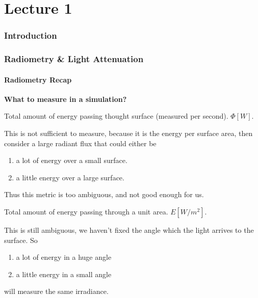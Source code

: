 \documentclass[../pbr.tex]{subfile}
\begin{document}
\part{Lecture 1}%
\label{prt:lecture_1}

\section{Introduction}%
\label{sec:introduction}

\section{Radiometry \& Light Attenuation}%
\label{sec:radiometry_&_light_attenuation}

\subsection{Radiometry Recap}%
\label{sub:radiometry_recap}

\textbf{What to measure in a simulation?}

\begin{definition}
  Total amount of energy passing thought surface (measured per second).
  $\Phi\left[W\right]$.
\end{definition}

This is not sufficient to measure, because it is the energy per surface area,
then consider a large radiant flux that could either be
\begin{enumerate}
  \item a lot of energy over a small surface.
  \item a little energy over a large surface.
\end{enumerate}

Thus this metric is too ambiguous, and not good enough for us.

\begin{definition}[Irradiance]
  Total amount of energy passing through a unit area. $E\left[W/m^2\right]$.
\end{definition}

This is still ambiguous, we haven't fixed the angle which the light arrives to the
surface. So
\begin{enumerate}
  \item a lot of energy in a huge angle
  \item a little energy in a small angle
\end{enumerate}
will measure the same irradiance.
\end{document}
